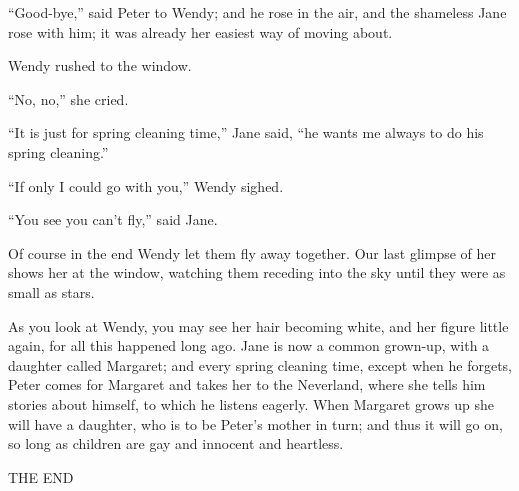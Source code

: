 ``Good-bye,'' said Peter to Wendy; and he rose in the air, and the
shameless Jane rose with him; it was already her easiest way of moving
about.

Wendy rushed to the window.

``No, no,'' she cried.

``It is just for spring cleaning time,'' Jane said, ``he wants me always
to do his spring cleaning.''

``If only I could go with you,'' Wendy sighed.

``You see you can't fly,'' said Jane.

Of course in the end Wendy let them fly away together. Our last glimpse
of her shows her at the window, watching them receding into the sky
until they were as small as stars.

As you look at Wendy, you may see her hair becoming white, and her
figure little again, for all this happened long ago. Jane is now a
common grown-up, with a daughter called Margaret; and every spring
cleaning time, except when he forgets, Peter comes for Margaret and
takes her to the Neverland, where she tells him stories about himself,
to which he listens eagerly. When Margaret grows up she will have a
daughter, who is to be Peter's mother in turn; and thus it will go on,
so long as children are gay and innocent and heartless.

THE END
